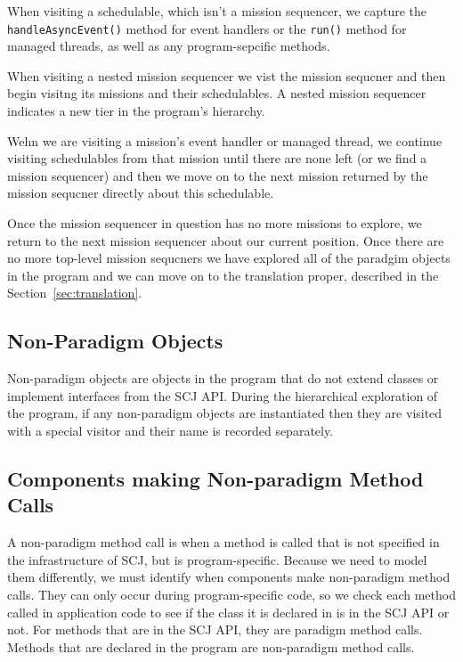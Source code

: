 \documentclass[10pt,a4paper]{article}
\begin{document}
When visiting a schedulable, which isn't a mission sequencer, we capture the \texttt{handleAsyncEvent()} method for event handlers or the \texttt{run()} method for managed threads, as well as any program-sepcific methods. 

When visiting a nested mission sequencer we vist the mission sequcner and then begin visitng its missions and their schedulables. A nested mission sequencer indicates a new tier in the program's hierarchy. 

Wehn we are visiting a mission's event handler or managed thread, we continue visiting schedulables from that mission until there are none left (or we find a mission sequencer) and then we move on to the next mission returned by the mission sequcner directly about this schedulable.

Once the mission sequencer in question has no more missions to explore, we return to the next mission sequencer about our current position. Once there are no more top-level mission sequcners we have explored all of the paradgim objects in the program and we can move on to the translation proper, described in the Section~\ref{sec:translation}.

\subsection{Non-Paradigm Objects}

Non-paradigm objects are objects in the program that do not extend classes or implement interfaces from the SCJ API. During the hierarchical exploration of the program, if any non-paradigm objects are instantiated then they are visited with a special visitor and their name is recorded separately.


\subsection{Components making Non-paradigm Method Calls}

A non-paradigm method call is when a method is called that is not specified in the infrastructure of SCJ, but is program-specific. Because we need to model them differently, we must identify when components make non-paradigm method calls. They can only occur during program-specific code, so we check each method called in application code to see if the class it is declared in is in the SCJ API or not. For methods that are in the SCJ API, they are paradigm method calls. Methods that are declared in the program are non-paradigm method calls. 
\end{document}
